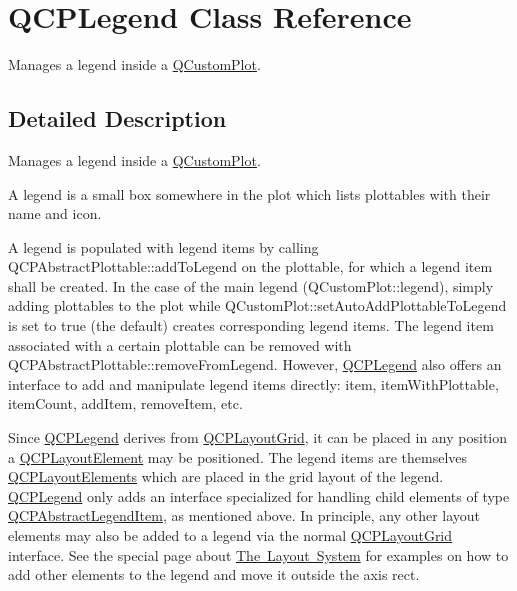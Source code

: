 \hypertarget{class_q_c_p_legend}{}\section{Q\+C\+P\+Legend Class Reference}
\label{class_q_c_p_legend}


Manages a legend inside a \mbox{\hyperlink{class_q_custom_plot}{Q\+Custom\+Plot}}.  




\subsection{Detailed Description}
Manages a legend inside a \mbox{\hyperlink{class_q_custom_plot}{Q\+Custom\+Plot}}. 

A legend is a small box somewhere in the plot which lists plottables with their name and icon.

A legend is populated with legend items by calling Q\+C\+P\+Abstract\+Plottable\+::add\+To\+Legend on the plottable, for which a legend item shall be created. In the case of the main legend (Q\+Custom\+Plot\+::legend), simply adding plottables to the plot while Q\+Custom\+Plot\+::set\+Auto\+Add\+Plottable\+To\+Legend is set to true (the default) creates corresponding legend items. The legend item associated with a certain plottable can be removed with Q\+C\+P\+Abstract\+Plottable\+::remove\+From\+Legend. However, \mbox{\hyperlink{class_q_c_p_legend}{Q\+C\+P\+Legend}} also offers an interface to add and manipulate legend items directly\+: item, item\+With\+Plottable, item\+Count, add\+Item, remove\+Item, etc.

Since \mbox{\hyperlink{class_q_c_p_legend}{Q\+C\+P\+Legend}} derives from \mbox{\hyperlink{class_q_c_p_layout_grid}{Q\+C\+P\+Layout\+Grid}}, it can be placed in any position a \mbox{\hyperlink{class_q_c_p_layout_element}{Q\+C\+P\+Layout\+Element}} may be positioned. The legend items are themselves \mbox{\hyperlink{class_q_c_p_layout_element}{Q\+C\+P\+Layout\+Elements}} which are placed in the grid layout of the legend. \mbox{\hyperlink{class_q_c_p_legend}{Q\+C\+P\+Legend}} only adds an interface specialized for handling child elements of type \mbox{\hyperlink{class_q_c_p_abstract_legend_item}{Q\+C\+P\+Abstract\+Legend\+Item}}, as mentioned above. In principle, any other layout elements may also be added to a legend via the normal \mbox{\hyperlink{class_q_c_p_layout_grid}{Q\+C\+P\+Layout\+Grid}} interface. See the special page about \mbox{\hyperlink{}{The Layout System}} for examples on how to add other elements to the legend and move it outside the axis rect.

